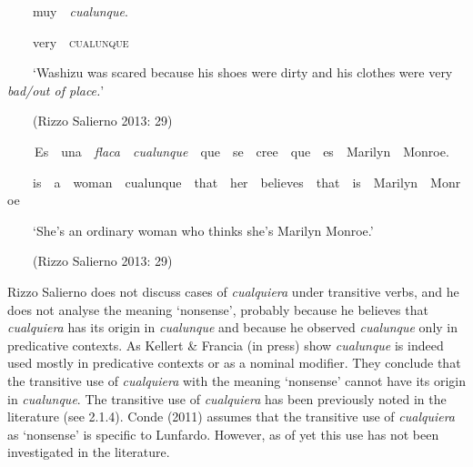 \begin{styleStandard}
\ \ \ \ muy\ \ \textit{cualunque}.
\end{styleStandard}

\begin{styleStandard}
\ \ \ \ very\ \ \textsc{cualunque}
\end{styleStandard}

\begin{styleStandard}
\ \ \ \ ‘Washizu was scared because his shoes were dirty and his clothes were very \textit{bad/out of place.}’
\end{styleStandard}

\begin{styleStandard}
\ \ \ \ (Rizzo Salierno 2013: 29)
\end{styleStandard}

\begin{styleStandard}
\textbf{\ \ }\ \ Es\ \ una\ \ \textit{flaca}\ \ \textit{cualunque}\ \ que\ \ se\ \ cree\ \ que\ \ es\ \ Marilyn\ \ Monroe.
\end{styleStandard}

\begin{styleStandard}
\ \ \ \ is\ \ a\ \ woman\ \ cualunque\ \ that\ \ her\ \ believes\ \ that\ \ is\ \ Marilyn\ \ Monroe
\end{styleStandard}

\begin{styleStandard}
\ \ \ \ ‘She’s an ordinary woman who thinks she’s Marilyn Monroe.’
\end{styleStandard}

\begin{styleStandard}
\ \ \ \ (Rizzo Salierno 2013: 29)
\end{styleStandard}

\begin{styleStandard}
Rizzo Salierno does not discuss cases of \textit{cualquiera} under transitive verbs, and he does not analyse the meaning ‘nonsense’, probably because he believes that \textit{cualquiera} has its origin in \textit{cualunque} and because he observed \textit{cualunque} only in predicative contexts. As Kellert \& Francia (in press) show \textit{cualunque }is indeed used mostly in predicative contexts or as a nominal modifier. They conclude that the transitive use of \textit{cualquiera} with the meaning ‘nonsense’ cannot have its origin in \textit{cualunque}. The transitive use of \textit{cualquiera} has been previously noted in the literature (see 2.1.4). Conde (2011) assumes that the transitive use of \textit{cualquiera} as ‘nonsense’ is specific to Lunfardo. However, as of yet this use has not been investigated in the literature.
\end{styleStandard}

